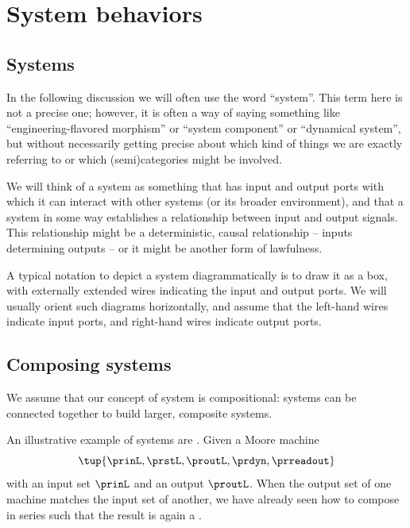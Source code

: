 

\section{System behaviors}


\subsection{Systems}

In the following discussion we will often use the word ``system''.
This term here is not a precise one; however, it is often a way of saying something like ``engineering-flavored morphism'' or ``system component'' or ``dynamical system'', but without necessarily getting precise about which kind of things we are exactly referring to or which (semi)categories might be involved.

We will think of a system as something that has input and output ports with which it can interact with other systems (or its broader environment), and that a system in some way establishes a relationship between input and output signals.
This relationship might be a deterministic, causal relationship -- inputs determining outputs -- or it might be another form of lawfulness.

A typical notation to depict a system diagrammatically is to draw it as a box, with externally extended wires indicating the input and output ports.
We will usually orient such diagrams horizontally, and assume that the left-hand wires indicate input ports, and right-hand wires indicate output ports.


\subsection{Composing systems}

We assume that our concept of system is compositional: systems can be connected together to build larger, composite systems.

An illustrative example of systems are .
Given a Moore machine
\begin{equation}
    \label{eq:moore-machine-specification}
    \tup{\prinL,\prstL,\proutL,\prdyn,\prreadout}
\end{equation}
with an input set $\prinL$ and an output $\proutL$.
When the output set of one machine matches the input set of another, we have already seen how to compose  in series such that the result is again a .

